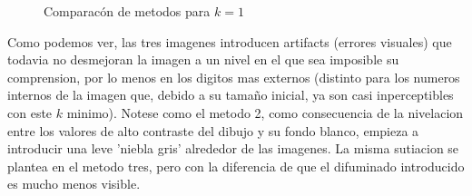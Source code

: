 \begin{figure}[H]
    \centering
    \qquad
    \qquad
    \caption{Comparacón de metodos para $k = 1$}
    \label{fig:example}
\end{figure}

Como podemos ver, las tres imagenes introducen artifacts (errores visuales) que todavia no desmejoran la imagen a un nivel en el que sea imposible su comprension, por lo menos en los digitos mas externos (distinto para los numeros internos de la imagen que, debido a su tamaño inicial, ya son casi inperceptibles con este $k$ minimo). Notese como el metodo 2, como consecuencia de la nivelacion entre los valores de alto contraste del dibujo y su fondo blanco, empieza a introducir una leve 'niebla gris' alrededor de las imagenes. La misma sutiacion se plantea en el metodo tres, pero con la diferencia de que el difuminado introducido es mucho menos visible.


